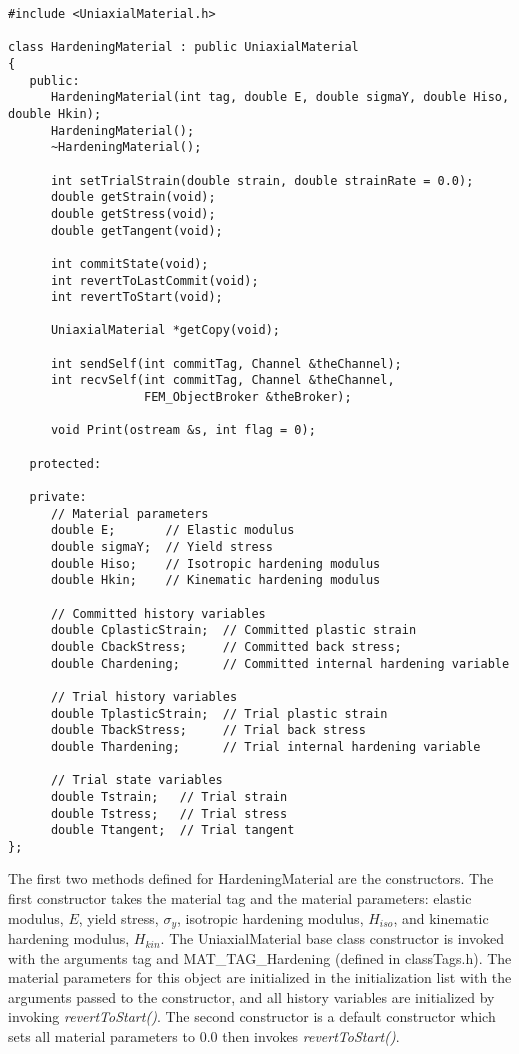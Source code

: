 \documentclass[12pt]{article}
\begin{document}
{\sf\small
\begin{verbatim}
#include <UniaxialMaterial.h>

class HardeningMaterial : public UniaxialMaterial
{
   public:
      HardeningMaterial(int tag, double E, double sigmaY, double Hiso, double Hkin);
      HardeningMaterial();
      ~HardeningMaterial();

      int setTrialStrain(double strain, double strainRate = 0.0); 
      double getStrain(void);          
      double getStress(void);
      double getTangent(void);

      int commitState(void);
      int revertToLastCommit(void);    
      int revertToStart(void);        

      UniaxialMaterial *getCopy(void);
    
      int sendSelf(int commitTag, Channel &theChannel);  
      int recvSelf(int commitTag, Channel &theChannel, 
                   FEM_ObjectBroker &theBroker);    
    
      void Print(ostream &s, int flag = 0);
    
   protected:
    
   private:
      // Material parameters
      double E;       // Elastic modulus
      double sigmaY;  // Yield stress
      double Hiso;    // Isotropic hardening modulus
      double Hkin;    // Kinematic hardening modulus

      // Committed history variables
      double CplasticStrain;  // Committed plastic strain
      double CbackStress;     // Committed back stress;
      double Chardening;      // Committed internal hardening variable

      // Trial history variables
      double TplasticStrain;  // Trial plastic strain
      double TbackStress;     // Trial back stress
      double Thardening;      // Trial internal hardening variable

      // Trial state variables
      double Tstrain;   // Trial strain
      double Tstress;   // Trial stress
      double Ttangent;  // Trial tangent
};
\end{verbatim}
}

\noindent The first two methods defined for HardeningMaterial are the constructors. The
first constructor takes the material tag and the material parameters: elastic modulus,
$E$, yield stress, $\sigma_y$, isotropic hardening modulus, $H_{iso}$, and kinematic
hardening modulus, $H_{kin}$. The UniaxialMaterial
base class constructor is invoked with the arguments tag and MAT\_TAG\_Hardening (defined
in classTags.h). The material parameters for this object are initialized in
the initialization list with the arguments passed to the constructor, and all
history variables are initialized by invoking {\em revertToStart()}.
The second constructor is a default constructor which sets all
material parameters to $0.0$ then invokes {\em revertToStart()}.
\end{document}
